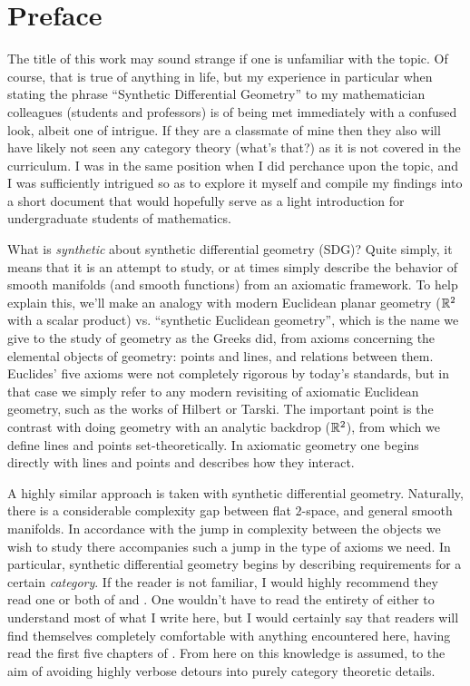\chapter*{Preface}

The title of this work may sound strange if one is unfamiliar with the topic. Of course, that is true of anything in life, but my experience in particular when stating the phrase ``Synthetic Differential Geometry'' to my mathematician colleagues (students and professors) is of being met immediately with a confused look, albeit one of intrigue. If they are a classmate of mine then they also will have likely not seen any category theory (what's that?) as it is not covered in the curriculum. I was in the same position when I did perchance upon the topic, and I was sufficiently intrigued so as to explore it myself and compile my findings into a short document that would hopefully serve as a light introduction for undergraduate students of mathematics.

What is \emph{synthetic} about synthetic differential geometry (SDG)? Quite simply, it means that it is an attempt to study, or at times simply describe the behavior of smooth manifolds (and smooth functions) from an axiomatic framework. To help explain this, we'll make an analogy with modern Euclidean planar geometry (\( \mathbb{R}^2 \) with a scalar product) vs. ``synthetic Euclidean geometry'', which is the name we give to the study of geometry as the Greeks did, from axioms concerning the elemental objects of geometry: points and lines, and relations between them. Euclides' five axioms were not completely rigorous by today's standards, but in that case we simply refer to any modern revisiting of axiomatic Euclidean geometry, such as the works of Hilbert or Tarski. The important point is the contrast with doing geometry with an analytic backdrop (\( \mathbb{R}^2 \)), from which we define lines and points set-theoretically. In axiomatic geometry one begins directly with lines and points and describes how they interact.

A highly similar approach is taken with synthetic differential geometry. Naturally, there is a considerable complexity gap between flat \( 2 \)-space, and general smooth manifolds. In accordance with the jump in complexity between the objects we wish to study there accompanies such a jump in the type of axioms we need. In particular, synthetic differential geometry begins by describing requirements for a certain \emph{category}. If the reader is not familiar, I would highly recommend they read one or both of \cite{sml71} and \cite{lei16}. One wouldn't have to read the entirety of either to understand most of what I write here, but I would certainly say that readers will find themselves completely comfortable with anything encountered here, having read the first five chapters of \cite{lei16}. From here on this knowledge is assumed, to the aim of avoiding highly verbose detours into purely category theoretic details.

